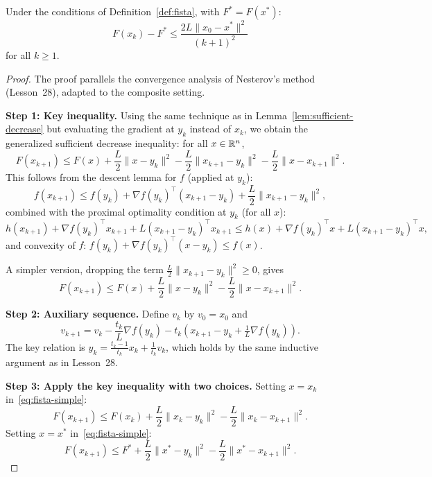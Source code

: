 \documentclass[11pt,a4paper]{article}
\begin{document}
\begin{theorem}\label{thm:fista}
Under the conditions of Definition~\ref{def:fista}, with $F^* = F(x^*)$:
\begin{equation}\label{eq:fista-rate}
  F(x_k) - F^* \le \frac{2L\|x_0 - x^*\|^2}{(k+1)^2}
\end{equation}
for all $k \ge 1$.
\end{theorem}

\begin{proof}
The proof parallels the convergence analysis of Nesterov's method
(Lesson~28), adapted to the composite setting.

\textbf{Step 1: Key inequality.}
Using the same technique as in Lemma~\ref{lem:sufficient-decrease}
but evaluating the gradient at $y_k$ instead of $x_k$, we obtain
the generalized sufficient decrease inequality: for all $x \in \mathbb{R}^n$,
\begin{equation}\label{eq:fista-key}
  F(x_{k+1}) \le F(x) + \frac{L}{2}\|x - y_k\|^2
  - \frac{L}{2}\|x_{k+1} - y_k\|^2 - \frac{L}{2}\|x - x_{k+1}\|^2.
\end{equation}
This follows from the descent lemma for $f$ (applied at $y_k$):
\[
  f(x_{k+1}) \le f(y_k) + \nabla f(y_k)^\top(x_{k+1} - y_k)
  + \frac{L}{2}\|x_{k+1} - y_k\|^2,
\]
combined with the proximal optimality condition at $y_k$
(for all $x$):
\[
  h(x_{k+1}) + \nabla f(y_k)^\top x_{k+1} + L(x_{k+1} - y_k)^\top x_{k+1}
  \le h(x) + \nabla f(y_k)^\top x + L(x_{k+1} - y_k)^\top x,
\]
and convexity of $f$: $f(y_k) + \nabla f(y_k)^\top(x - y_k) \le f(x)$.

A simpler version, dropping the term
$\frac{L}{2}\|x_{k+1} - y_k\|^2 \ge 0$, gives
\begin{equation}\label{eq:fista-simple}
  F(x_{k+1}) \le F(x) + \frac{L}{2}\|x - y_k\|^2
  - \frac{L}{2}\|x - x_{k+1}\|^2.
\end{equation}

\textbf{Step 2: Auxiliary sequence.}
Define $v_k$ by $v_0 = x_0$ and
\begin{equation}\label{eq:fista-vk}
  v_{k+1} = v_k - \frac{t_k}{L}\nabla f(y_k)
  - t_k(x_{k+1} - y_k + \tfrac{1}{L}\nabla f(y_k)).
\end{equation}
The key relation is $y_k = \frac{t_k - 1}{t_k}x_k + \frac{1}{t_k}v_k$,
which holds by the same inductive argument as in Lesson~28.

\textbf{Step 3: Apply the key inequality with two choices.}
Setting $x = x_k$ in~\eqref{eq:fista-simple}:
\begin{equation}\label{eq:at-xk}
  F(x_{k+1}) \le F(x_k) + \frac{L}{2}\|x_k - y_k\|^2
  - \frac{L}{2}\|x_k - x_{k+1}\|^2.
\end{equation}
Setting $x = x^*$ in~\eqref{eq:fista-simple}:
\begin{equation}\label{eq:at-xstar}
  F(x_{k+1}) \le F^* + \frac{L}{2}\|x^* - y_k\|^2
  - \frac{L}{2}\|x^* - x_{k+1}\|^2.
\end{equation}


\end{proof}
\end{document}
